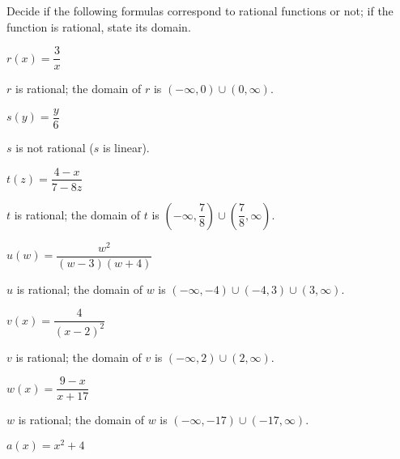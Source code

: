 \begin{exercises}
\begin{problem}
Decide if the following formulas correspond to rational functions or not; 
if the function is rational, state its domain.
\begin{multicols}{3}
	\begin{subproblem}
		$r(x)=\dfrac{3}{x}$    
		\begin{shortsolution}
			$r$ is rational; the domain of $r$ is $(-\infty,0)\cup (0,\infty)$.
		\end{shortsolution}
	\end{subproblem}
	\begin{subproblem}
		$s(y)=\dfrac{y}{6}$    
		\begin{shortsolution}
			$s$ is not rational ($s$ is linear). 
		\end{shortsolution}
	\end{subproblem}
	\begin{subproblem}
		$t(z)=\dfrac{4-x}{7-8z}$    
		\begin{shortsolution}
			$t$ is rational; the domain of $t$ is $\left( -\infty,\dfrac{7}{8} \right)\cup \left( \dfrac{7}{8},\infty \right)$.
		\end{shortsolution}
	\end{subproblem}
	\begin{subproblem}
		$u(w)=\dfrac{w^2}{(w-3)(w+4)}$ 
		\begin{shortsolution}
			$u$ is rational; the domain of $w$ is $(-\infty,-4)\cup(-4,3)\cup(3,\infty)$. 
		\end{shortsolution}
	\end{subproblem}
	\begin{subproblem}
		$v(x)=\dfrac{4}{(x-2)^2}$ 
		\begin{shortsolution}
			$v$ is rational; the domain of $v$ is $(-\infty,2)\cup(2,\infty)$. 
		\end{shortsolution}
	\end{subproblem}
	\begin{subproblem}
		$w(x)=\dfrac{9-x}{x+17}$ 
		\begin{shortsolution}
			$w$ is rational; the domain of $w$ is $(-\infty,-17)\cup(-17,\infty)$. 
		\end{shortsolution}
	\end{subproblem}
	\begin{subproblem}
		$a(x)=x^2+4$ 

\end{subproblem}
\end{multicols}
\end{problem}
\end{exercises}
